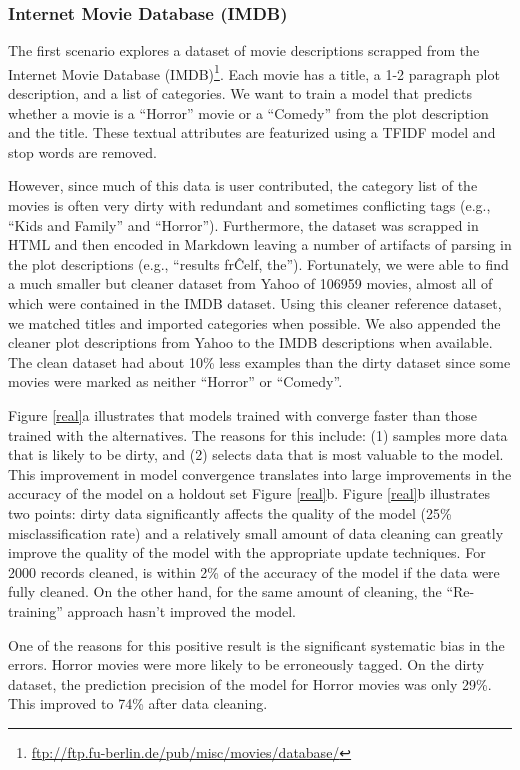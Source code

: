 \subsubsection{Internet Movie Database (IMDB)}
The first scenario explores a dataset of movie descriptions scrapped from the Internet Movie Database (IMDB)\footnote{\url{ftp://ftp.fu-berlin.de/pub/misc/movies/database/}}. 
Each movie has a title, a 1-2 paragraph plot description, and a list of categories.
We want to train a model that predicts whether a movie is a ``Horror'' movie or a ``Comedy'' from the plot description and the title.
These textual attributes are featurized using a TFIDF model and stop words are removed. 

However, since much of this data is user contributed, the category list of the movies is often very dirty with redundant and sometimes conflicting tags (e.g., ``Kids and Family'' and ``Horror''). 
Furthermore, the dataset was scrapped in HTML and then encoded in Markdown leaving a number of artifacts of parsing in the plot descriptions (e.g., ``results fr\^Celf, the'').
Fortunately, we were able to find a much smaller but cleaner dataset from Yahoo of 106959 movies, almost all of which were contained in the IMDB dataset.
Using this cleaner reference dataset, we matched titles and imported categories when possible.
We also appended the cleaner plot descriptions from Yahoo to the IMDB descriptions when available.
The clean dataset had about 10\% less examples than the dirty dataset since some movies were marked as neither  ``Horror'' or ``Comedy''.

Figure \ref{real}a illustrates that models trained with \sys converge faster than those trained with the alternatives.
The reasons for this include: (1) \sys samples more data that is likely to be dirty, and (2) \sys selects data that is most valuable to the model.
This improvement in model convergence translates into large improvements in the accuracy of the model on a holdout set Figure \ref{real}b.
Figure \ref{real}b illustrates two points: dirty data significantly affects the quality of the model (25\% misclassification rate) and a relatively small amount of data cleaning can greatly improve the quality of the model with the appropriate update techniques.
For 2000 records cleaned, \sys is within 2\% of the accuracy of the model if the data were fully cleaned.
On the other hand, for the same amount of cleaning, the ``Re-training'' approach hasn't improved the model. 

One of the reasons for this positive result is the significant systematic bias in the errors. Horror movies were more likely to be erroneously tagged. 
On the dirty dataset, the prediction precision of the model for Horror movies was only 29\%.
This improved to 74\% after data cleaning.

